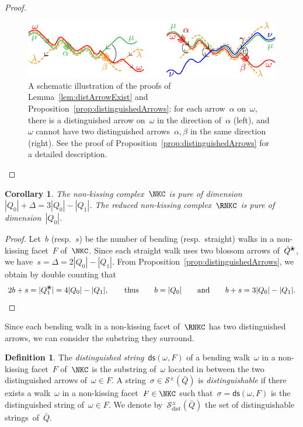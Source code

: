 \documentclass{amsart}
\newtheorem{corollary}[theorem]{Corollary}
\theoremstyle{definition}
\newtheorem{definition}[theorem]{Definition}
\newcommand{\darkblue}{\color{darkblue}} %
\newcommand{\defn}[1]{\textsl{\darkblue #1}} %
\newcommand{\blossom}{^\text{\ding{96}}} %
\newcommand{\strings}{\mathcal{S}} %
\newcommand{\distinguishableStrings}{\mathcal{S}_\mathrm{dist}} %
\newcommand{\distinguishedString}[2]{\mathsf{ds}(#1,#2)} %
\begin{document}
\begin{proof}
\begin{figure}[t]
	\capstart
	\centerline{\includegraphics[scale=1]{pure}}
	\caption{A schematic illustration of the proofs of Lemma~\ref{lem:distArrowExist} and Proposition~\ref{prop:distinguishedArrows}: for each arrow~$\alpha$ on~$\omega$, there is a distinguished arrow on~$\omega$ in the direction of~$\alpha$ (left), and~$\omega$ cannot have two distinguished arrows~$\alpha, \beta$ in the same direction (right). See the proof of Proposition~\ref{prop:distinguishedArrows} for a detailed description.}
	\label{fig:pure}
\end{figure}
\end{proof}

\begin{corollary}
\label{coro:pure}
The non-kissing complex~$\NKC$ is pure of dimension~$|Q_0| + \Delta = 3|Q_0|-|Q_1|$. The reduced non-kissing complex~$\RNKC$ is pure of dimension~$|Q_0|$.
\end{corollary}

\begin{proof}
Let~$b$ (resp.~$s$) be the number of bending (resp.~straight) walks in a non-kissing facet~$F$ of~$\NKC$.
Since each straight walk uses two blossom arrows of~$\bar Q\blossom$, we have~$s = \Delta = 2|Q_0|-|Q_1|$.
From Proposition~\ref{prop:distinguishedArrows}, we obtain by double counting that
\[
2b+s = |Q\blossom_1| = 4|Q_0|-|Q_1|,
\qquad\text{thus}\qquad
b = |Q_0|
\qquad\text{and}\qquad
b+s = 3|Q_0|-|Q_1|.
\qedhere
\]
\end{proof}

Since each bending walk in a non-kissing facet of~$\RNKC$ has two distinguished arrows, we can consider the substring they surround.

\begin{definition}
\label{def:distinguishedSubstring}
The \defn{distinguished string}~$\distinguishedString{\omega}{F}$ of a bending walk~$\omega$ in a non-kissing facet~$F$ of~$\NKC$ is the substring of~$\omega$ located in between the two distinguished arrows of~$\omega \in F$.
A string~${\sigma \in \strings^\pm(\bar Q)}$ is \defn{distinguishable} if there exists a walk~$\omega$ in a non-kissing facet~$F \in \NKC$ such that~$\sigma = \distinguishedString{\omega}{F}$ is the distinguished string of~$\omega \in F$.
We denote by~$\distinguishableStrings^\pm(\bar Q)$ the set of distinguishable strings~of~$\bar Q$.
\end{definition}
\end{document}
